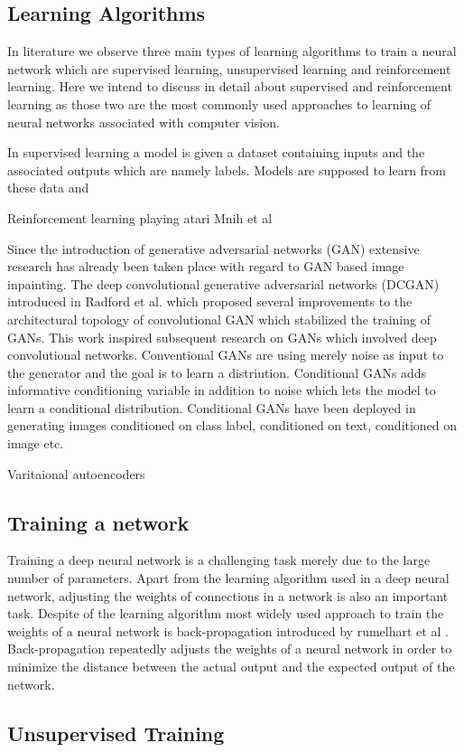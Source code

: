 \subsection{Learning Algorithms}
\label{se:supervisedlearning}

In literature we observe three main types of learning algorithms to train a neural network which are supervised learning, unsupervised learning and reinforcement learning. Here we intend to discuss in detail about supervised and reinforcement learning as those two are the most commonly used approaches to learning of neural networks associated with computer vision.

In supervised learning a model is given a dataset containing inputs and the associated outputs which are namely labels. Models are supposed to learn from these data and 

Reinforcement learning
\cite{mnih2013playing} playing atari Mnih et al

Since the introduction of generative adversarial networks (GAN)\cite{goodfellow2014generative} extensive research has already been taken place with regard to GAN based image inpainting. The deep convolutional generative adversarial networks (DCGAN) introduced in Radford et al.\cite{radford2015unsupervised} which proposed several improvements to the architectural topology of convolutional GAN which stabilized the training of GANs. This work inspired subsequent research on GANs which involved deep convolutional networks. Conventional GANs are using merely noise as input to the generator and the goal is to learn a distriution. Conditional GANs adds informative conditioning variable in addition to noise which lets the model to learn a conditional distribution. Conditional GANs have been deployed in generating images conditioned on class label\cite{mirza2014conditional}, conditioned on text\cite{reed2016generative}, conditioned on image\cite{isola2017image} etc.

Varitaional autoencoders \cite{kingma2013auto}


\subsection{Training a network}
\label{se:rl}

Training a deep neural network is a challenging task merely due to the large number of parameters. Apart from the learning algorithm used in a deep neural network, adjusting the weights of connections in a network is also an important task. Despite of the learning algorithm most widely used approach to train the weights of a neural network is back-propagation introduced by rumelhart et al \cite{rumelhart1986learning}. Back-propagation repeatedly adjusts the weights of a neural network in order to minimize the distance between the actual output and the expected output of the network. 

\subsection{Unsupervised Training}
\label{se:adversariatraining}

